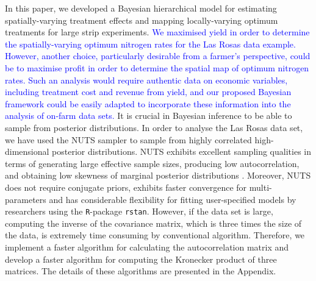 \documentclass[a4paper]{article}   	%
\newcommand{\R}{\texttt{R}}
\newcommand{\rstan}{\texttt{rstan}}
\newcommand{\Matern}{Mat\'ern }
\begin{document}
	In this paper, we developed a Bayesian hierarchical model for estimating spatially-varying treatment effects and mapping locally-varying optimum treatments for large strip experiments. \textcolor{blue}{We maximised yield in order to determine the spatially-varying optimum nitrogen rates for the Las Rosas data example. However, another choice, particularly desirable from a farmer's perspective, could be to maximise profit in order to determine the spatial map of optimum nitrogen rates. Such an analysis would require authentic data on economic variables, including treatment cost and revenue from yield, and our proposed Bayesian framework could be easily adapted to incorporate these information into the analysis of on-farm data sets.} It is crucial in Bayesian inference to be able to sample from posterior distributions. In order to analyse the Las Rosas data set, we have used the NUTS sampler to sample from highly correlated high-dimensional posterior distributions. NUTS exhibits excellent sampling qualities in terms of generating large effective sample sizes, producing low autocorrelation, and obtaining low skewness of marginal posterior distributions \parencite{Nishio2019Performance}. Moreover, NUTS does not require conjugate priors, exhibits faster convergence for multi-parameters and has considerable flexibility for fitting user-specified models by researchers using the \R-package \rstan. However, if the data set is large, computing the inverse of the covariance matrix, which is three times the size of the data, is extremely time consuming by conventional algorithm. Therefore, we implement a faster algorithm for calculating the autocorrelation matrix and develop a faster algorithm for computing the Kronecker product of three matrices. The details of these algorithms are presented in the Appendix. 
	
	
	
\end{document}
